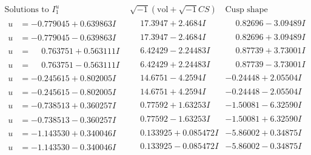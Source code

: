 \documentclass[1p]{elsarticle_modified}
\theoremstyle{definition}
\newcommand{\I}{\sqrt{-1}}
\begin{document}
$$\begin{array}{c|c|c}  
\text{Solutions to }I^u_{1}& \I (\text{vol} + \sqrt{-1}CS) & \text{Cusp shape}\\
 \hline 
\begin{aligned}
u &= -0.779045 + 0.639863 I\end{aligned}
 & \phantom{-}17.3947 + 2.4684 I & \phantom{-}0.82696 - 3.09489 I \\ \hline\begin{aligned}
u &= -0.779045 - 0.639863 I\end{aligned}
 & \phantom{-}17.3947 - 2.4684 I & \phantom{-}0.82696 + 3.09489 I \\ \hline\begin{aligned}
u &= \phantom{-}0.763751 + 0.563111 I\end{aligned}
 & \phantom{-}6.42429 - 2.24483 I & \phantom{-}0.87739 + 3.73001 I \\ \hline\begin{aligned}
u &= \phantom{-}0.763751 - 0.563111 I\end{aligned}
 & \phantom{-}6.42429 + 2.24483 I & \phantom{-}0.87739 - 3.73001 I \\ \hline\begin{aligned}
u &= -0.245615 + 0.802005 I\end{aligned}
 & \phantom{-}14.6751 - 4.2594 I & -0.24448 + 2.05504 I \\ \hline\begin{aligned}
u &= -0.245615 - 0.802005 I\end{aligned}
 & \phantom{-}14.6751 + 4.2594 I & -0.24448 - 2.05504 I \\ \hline\begin{aligned}
u &= -0.738513 + 0.360257 I\end{aligned}
 & \phantom{-}0.77592 + 1.63253 I & -1.50081 - 6.32590 I \\ \hline\begin{aligned}
u &= -0.738513 - 0.360257 I\end{aligned}
 & \phantom{-}0.77592 - 1.63253 I & -1.50081 + 6.32590 I \\ \hline\begin{aligned}
u &= -1.143530 + 0.340046 I\end{aligned}
 & \phantom{-}0.133925 + 0.085472 I & -5.86002 + 0.34875 I \\ \hline\begin{aligned}
u &= -1.143530 - 0.340046 I\end{aligned}
 & \phantom{-}0.133925 - 0.085472 I & -5.86002 - 0.34875 I \\ \hline\begin{aligned}

\end{aligned}
\end{array}$$
\end{document}
